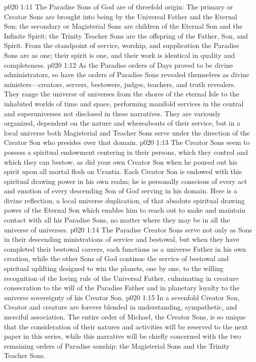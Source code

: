 \pc \vs p020 1:11 The Paradise Sons of God are of threefold origin: The primary or Creator Sons are brought into being by the Universal Father and the Eternal Son; the secondary or Magisterial Sons are children of the Eternal Son and the Infinite Spirit; the Trinity Teacher Sons are the offspring of the Father, Son, and Spirit. From the standpoint of service, worship, and supplication the Paradise Sons are as one; their spirit is one, and their work is identical in quality and completeness.
\vs p020 1:12 As the Paradise orders of Days proved to be divine administrators, so have the orders of Paradise Sons revealed themselves as divine ministers---creators, servers, bestowers, judges, teachers, and truth revealers. They range the universe of universes from the shores of the eternal Isle to the inhabited worlds of time and space, performing manifold services in the central and superuniverses not disclosed in these narratives. They are variously organized, dependent on the nature and whereabouts of their service, but in a local universe both Magisterial and Teacher Sons serve under the direction of the Creator Son who presides over that domain.
\vs p020 1:13 The Creator Sons seem to possess a spiritual endowment centering in their persons, which they control and which they can bestow, as did your own Creator Son when he poured out his spirit upon all mortal flesh on Urantia. Each Creator Son is endowed with this spiritual drawing power in his own realm; he is personally conscious of every act and emotion of every descending Son of God serving in his domain. Here is a divine reflection, a local universe duplication, of that absolute spiritual drawing power of the Eternal Son which enables him to reach out to make and maintain contact with all his Paradise Sons, no matter where they may be in all the universe of universes.
\vs p020 1:14 The Paradise Creator Sons serve not only as Sons in their descending ministrations of service and bestowal, but when they have completed their bestowal careers, each functions as a universe Father in his own creation, while the other Sons of God continue the service of bestowal and spiritual uplifting designed to win the planets, one by one, to the willing recognition of the loving rule of the Universal Father, culminating in creature consecration to the will of the Paradise Father and in planetary loyalty to the universe sovereignty of his Creator Son.
\vs p020 1:15 In a sevenfold Creator Son, Creator and creature are forever blended in understanding, sympathetic, and merciful association. The entire order of Michael, the Creator Sons, is so unique that the consideration of their natures and activities will be reserved to the next paper in this series, while this narrative will be chiefly concerned with the two remaining orders of Paradise sonship: the Magisterial Sons and the Trinity Teacher Sons.
